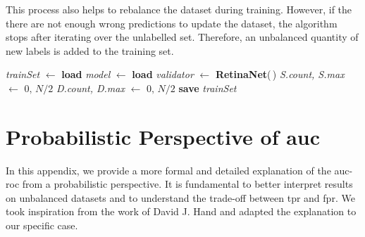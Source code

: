 \begin{appendices}
    This process also helps to rebalance the dataset during training. 
    However, if the there are not enough wrong predictions to update the dataset, 
    the algorithm stops after iterating over the unlabelled set. Therefore, an 
    unbalanced quantity of new labels is added to the training set.
    \begin{algorithm}
        \vspace{0.2cm}
        \DontPrintSemicolon
        \textit{trainSet} $\gets$ \textbf{load} \;
        \textit{model} $\gets$ \textbf{load} \;
        \textit{validator} $\gets$ \textbf{RetinaNet}(\,)\;
        \textit{S.count, S.max} $\gets$ $0, \,N/2$\;
        \textit{D.count, D.max} $\gets$ $0, \,N/2$\;
        \textbf{save} \textit{trainSet}\;
    \end{algorithm}

\chapter{Probabilistic Perspective of \acs{auc}}
\label{appendix:auc_probabilistic}
In this appendix, we provide a more formal and detailed explanation of the \ac{auc}-\ac{roc}
from a probabilistic perspective. It is fundamental to better interpret results on 
unbalanced datasets and to understand the trade-off between \ac{tpr} and \ac{fpr}.
We took inspiration from the work of David J. Hand \cite{roc_auc_probabilistic} 
and adapted the explanation to our specific case.


\end{appendices}
